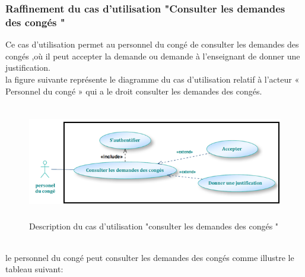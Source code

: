 \documentclass[12 pt]{report}
\begin{document}
\subsubsection{Raffinement du cas d'utilisation "Consulter les demandes des congés "}
Ce cas d'utilisation permet au personnel du congé de consulter les demandes des congés ,où  il peut accepter la demande ou demande à l'enseignant de donner une justification.\\
la figure suivante représente le diagramme du cas d’utilisation  relatif à l’acteur « Personnel du congé » qui a le droit consulter les demandes des congés.
\begin{figure}[h]
\begin{center}
\includegraphics[width= 13cm , height =5cm]{cas_gererconge.PNG}
\caption{Description du cas d'utilisation "consulter les demandes des congés "}
\end{center}
\end{figure}\\
le personnel du congé peut consulter les demandes des congés comme illustre le tableau suivant:
\end{document}

